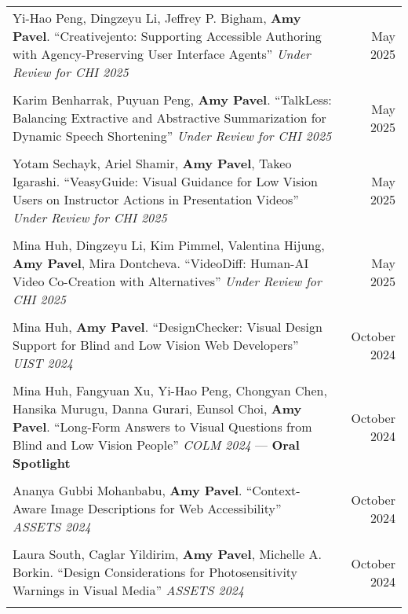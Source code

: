 \begin{longtable}{Xr}
	Yi-Hao Peng, Dingzeyu Li, Jeffrey P. Bigham, \textbf{Amy Pavel}. ``Creativejento: Supporting Accessible Authoring with Agency-Preserving User Interface Agents'' \textit{Under Review for CHI 2025} & May 2025 \\
	\\

	Karim Benharrak, Puyuan Peng, \textbf{Amy Pavel}. ``TalkLess: Balancing Extractive and Abstractive Summarization for Dynamic Speech Shortening'' \textit{Under Review for CHI 2025} & May 2025 \\
	\\

	Yotam Sechayk, Ariel Shamir, \textbf{Amy Pavel}, Takeo Igarashi. ``VeasyGuide: Visual Guidance for Low Vision Users on Instructor Actions in Presentation Videos'' \textit{Under Review for CHI 2025} & May 2025 \\
	\\

	Mina Huh, Dingzeyu Li, Kim Pimmel, Valentina Hijung, \textbf{Amy Pavel}, Mira Dontcheva. ``VideoDiff: Human-AI Video Co-Creation with Alternatives'' \textit{Under Review for CHI 2025} & May 2025 \\
	\\

	Mina Huh, \textbf{Amy Pavel}. ``DesignChecker: Visual Design Support for Blind and Low Vision Web Developers'' \textit{UIST 2024} & October 2024 \\
	\\

	Mina Huh, Fangyuan Xu, Yi-Hao Peng, Chongyan Chen, Hansika Murugu, Danna Gurari, Eunsol Choi, \textbf{Amy Pavel}. ``Long-Form Answers to Visual Questions from Blind and Low Vision People'' \textit{COLM 2024} --- \textbf{Oral Spotlight} & October 2024 \\
	\\

	Ananya Gubbi Mohanbabu, \textbf{Amy Pavel}. ``Context-Aware Image Descriptions for Web Accessibility'' \textit{ASSETS 2024} & October 2024 \\
	\\

	Laura South, Caglar Yildirim, \textbf{Amy Pavel}, Michelle A. Borkin. ``Design Considerations for Photosensitivity Warnings in Visual Media'' \textit{ASSETS 2024} & October 2024 \\
	\\


\end{longtable}
